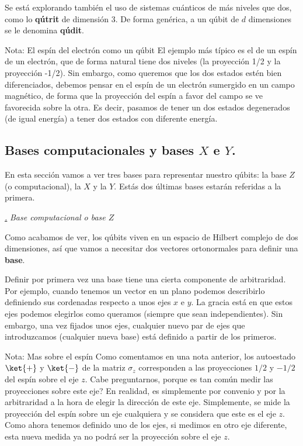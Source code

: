 \documentclass[a4paper,11pt]{book} %
\numberwithin{equation}{chapter}
\def\subsubiContadorIt{\par\addtocounter{subsubsection}{1}\underline{\it\thesubsubsection.}\hskip0.5cm \setcounter{subsubsubsectionIt}{0}}
\newcommand{\SubsubiIt}[1]{
		\subsubiContadorIt \textit{#1}
	}
\newcounter{subsubsubsectionIt}[subsubsection]
\begin{document}
Se está explorando también el uso de sistemas cuánticos de más niveles que dos, como lo \textbf{qútrit} de dimensión 3. De forma genérica, a un qúbit de $d$ dimensiones se le denomina \textbf{qúdit}.



\begin{mybox_blue}{Nota: El espín del electrón como un qúbit}
El ejemplo más típico es el de un espín de un electrón, que de forma natural tiene dos niveles (la proyección 1/2 y la proyección -1/2). Sin embargo, como queremos que los dos estados estén bien diferenciados, debemos pensar en el espín de un electrón sumergido en un campo magnético, de forma que la proyección del espín a favor del campo se ve favorecida sobre la otra. Es decir, pasamos de tener un dos estados degenerados (de igual energía) a tener dos estados con diferente energía. 
\end{mybox_blue}


	

	  	\subsection{Bases computacionales y bases $X$ e $Y$.}
	  	
En esta sección vamos a ver tres bases para representar nuestro qúbits: la base $Z$ (o computacional), la $X$ y la $Y$. Estás dos últimas bases estarán referidas a la primera.  
	  	
			\SubsubiIt{Base computacional o base $Z$} 
    	
Como acabamos de ver, los qúbits viven en un espacio de Hilbert complejo de dos dimensiones, así que vamos a necesitar dos vectores ortonormales para definir una \textbf{base}. 
    	
Definir por primera vez una base tiene una cierta componente de arbitraridad. Por ejemplo, cuando tenemos un vector en un plano podemos describirlo definiendo sus cordenadas respecto a unos ejes $x$ e $y$. La gracia está en que estos ejes podemos elegirlos como queramos (siempre que sean independientes). Sin embargo, una vez fijados unos ejes, cualquier nuevo par de ejes que introduzcamos (cualquier nueva base) está definido a partir de los primeros.


	\begin{mybox_blue}{Nota: Mas sobre el espín}
	Como comentamos en una nota anterior, los autoestado  $\ket{+}$ y $\ket{-}$ de la matriz $\sigma_z$ 
	corresponden a las proyecciones $1/2$ y $-1/2$ del espín sobre el eje $z$. Cabe preguntarnos, porque 
	es tan común medir las proyecciones sobre este eje? En realidad, es simplemente por convenio y 
	por la arbitraridad a la hora de elegir la dirección de este eje. Simplemente, se mide la 
	proyección del espín sobre un eje cualquiera y se considera que este es el eje $z$. Como ahora 
	tenemos definido uno de los ejes, si medimos en otro eje diferente, esta nueva medida  ya no podrá 
	ser la proyección sobre el eje $z$. 
	\end{mybox_blue}
\end{document}
